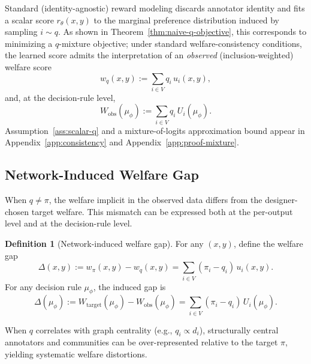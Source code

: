 \documentclass{article}
\theoremstyle{plain}
\theoremstyle{definition}
\newtheorem{definition}[theorem]{Definition}
\theoremstyle{remark}
\begin{document}
Standard (identity-agnostic) reward modeling discards annotator identity and fits a scalar score
$r_\theta(x,y)$ to the marginal preference distribution induced by sampling $i\sim q$.
As shown in Theorem~\ref{thm:naive-q-objective}, this corresponds to minimizing a $q$-mixture objective; under standard welfare-consistency conditions, the learned score admits the interpretation of an \emph{observed} (inclusion-weighted) welfare score
\begin{equation}
    w_q(x,y) := \sum_{i\in V} q_i\, u_i(x,y),
\end{equation}
and, at the decision-rule level,
\begin{equation}
    W_{\text{obs}}(\mu_\phi)
    :=
    \sum_{i\in V} q_i\, U_i(\mu_\phi).
    \label{eq:obs-welfare}
\end{equation}
Assumption~\ref{ass:scalar-q} and a mixture-of-logits approximation bound appear in Appendix~\ref{app:consistency} and Appendix~\ref{app:proof-mixture}.

\subsection{Network-Induced Welfare Gap}
\label{subsec:welfare-gap}

When $q\neq \pi$, the welfare implicit in the observed data differs from the
designer-chosen target welfare. This mismatch can be expressed both at the
per-output level and at the decision-rule level.

\begin{definition}[Network-induced welfare gap]
For any $(x,y)$, define the welfare gap
\begin{equation}
    \Delta(x,y)
    :=
    w_\pi(x,y) - w_q(x,y)
    =
    \sum_{i\in V}(\pi_i-q_i)\,u_i(x,y).
    \label{eq:welfare-gap-output}
\end{equation}
For any decision rule $\mu_\phi$, the induced gap is
\begin{equation}
    \Delta(\mu_\phi)
    :=
    W_{\text{target}}(\mu_\phi) - W_{\text{obs}}(\mu_\phi)
    =
    \sum_{i\in V}(\pi_i-q_i)\,U_i(\mu_\phi).
    \label{eq:welfare-gap-policy}
\end{equation}
\end{definition}

When $q$ correlates with graph centrality (e.g., $q_i\propto d_i$), structurally
central annotators and communities can be over-represented relative to the
target $\pi$, yielding systematic welfare distortions.
\end{document}
